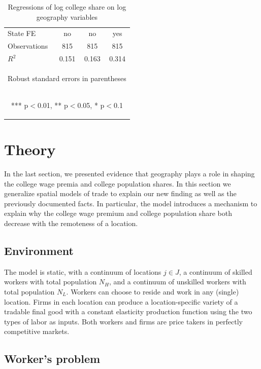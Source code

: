\documentclass[12 pt]{article}
\begin{document}
\begin{table}
\begin{tabular}{lccc}
    State FE & \mbox{no} & \mbox{no} & \mbox{yes} \\
    Observations & 815 & 815 & 815 \\
     $R^2$ & 0.151 & 0.163 & 0.314 \\ \hline
    \multicolumn{4}{c}{\begin{footnotesize} Robust standard errors in parentheses\end{footnotesize}} \\
    \multicolumn{4}{c}{\begin{footnotesize} *** p$<$0.01, ** p$<$0.05, * p$<$0.1\end{footnotesize}} \\
    \end{tabular}
   \caption{Regressions of log college share on log geography variables}
    \label{tab:col_reg}
\end{table}

\section{Theory}
In the last section, we presented evidence that geography plays a role in shaping the college wage premia and college population shares. In this section we generalize spatial models of trade to explain our new finding as well as the previously documented facts. In particular, the model introduces a mechanism to explain why the college wage premium and college population share both decrease with the remoteness of a location.

\subsection{Environment}

The model is static, with a continuum of locations $j \in J$, a continuum of skilled workers with total population $N_H$, and a continuum of unskilled workers with total population $N_L$.  Workers can choose to reside and work in any (single) location.  Firms in each location can produce a location-specific variety of a tradable final good with a constant elasticity production function using the two types of labor as inputs. Both workers and firms are price takers in perfectly competitive markets.

\subsection{Worker's problem}
\end{document}
